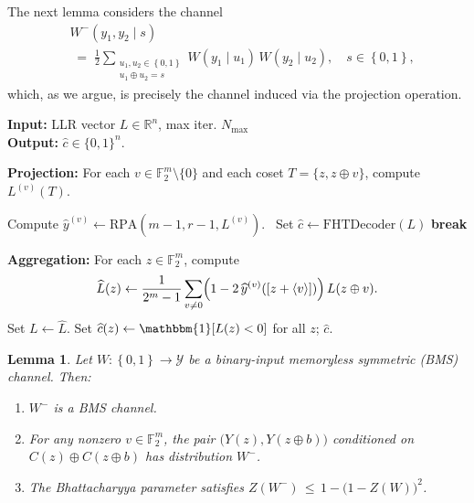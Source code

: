 \documentclass[conference,letterpaper]{IEEEtran}
\newcommand{\bits}{\left\{0,1\right\}}
\newcommand{\F}{{\mathbb F}}
\newcommand{\cY}{\mathcal{Y}}
\newcommand{\PR}[1]{{\mathbb{P}}\left\{ #1\right\}}
\newtheorem{lemma}[theorem]{Lemma}
\newcommand{\indic}[1]{\mathbbm{1} [ #1] }
\begin{document}
The next lemma considers the channel
\begin{align*}
 & W^-(y_1,y_2 \mid s)
 \\ & \;=\;
  \frac{1}{2}
  \sum_{\substack{u_1,u_2 \in \bits \\ u_1 \oplus u_2 = s}}
    W(y_1 \mid u_1)\,W(y_2 \mid u_2),
  \quad s \in \bits,
\end{align*}
which, as we argue, is precisely the channel induced via the projection operation.
 \begin{algorithm}[t]
\caption{RPA Decoder for RM$(m,r)$}
\label{alg:RPA-BMS-r1}
\textbf{Input:} LLR vector $L\in\mathbb{R}^{n}$, max iter. $N_{\max}$\\
\textbf{Output:} $\widehat{c}\in\{0,1\}^{n}$.

\begin{algorithmic}[1]
  \State \textbf{Projection:} For each $v\in \mathbb{F}_2^m\!\setminus\!\{0\}$ and each coset $T=\{z,z\oplus v\}$, compute $L^{(v)}(T)$.
  
   Compute $\widehat{y}^{(v)} \leftarrow \mathrm{RPA}(m{-}1,r{-}1,L^{(v)})$.
  \Else\ Set $\widehat{c}\leftarrow \mathrm{FHTDecoder}(L)$ \textbf{break}
\EndIf

  \State \textbf{Aggregation:} For each $z\in\mathbb{F}_2^m$, compute
  \[
     \widehat{L}(z) \gets \frac{1}{2^m-1}\sum_{v\neq 0}\Bigl(1-2\,\widehat{y}^{(v)}([z+\langle v\rangle])\Bigr)\,L(z\oplus v).
  \]
  \State Set $L\gets \widehat{L}$.
\EndFor
\State Set $\widehat{c}(z)\gets \indic{L(z)<0}$ for all $z$; \Return $\widehat{c}$.
\end{algorithmic}
\end{algorithm}
\begin{lemma}\label{lem:induced-channel}
Let \(W \colon \bits \to \cY\) be a binary-input memoryless symmetric (BMS) channel.  
Then:
\begin{enumerate}
    \item $W^-$ is a BMS channel. 
    \item 
  For any nonzero \(v \in \F_2^m\), the pair \(\bigl(Y(z),Y(z\oplus b)\bigr)\) conditioned on \(C(z) \oplus C(z\oplus b)\) has distribution \(W^-\).
  \item The Bhattacharyya parameter satisfies \(Z(W^-)\,\le\,1 - \bigl(1 - Z(W)\bigr)^2\).
\end{enumerate}
\end{lemma}
\end{document}
